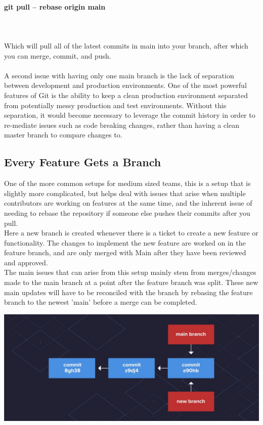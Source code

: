 \documentclass{article}
\begin{document}
\paragraph{git pull -- rebase origin main} \mbox{}\\ \\
Which will pull all of the latest commits in main into your branch, after which you can merge, commit, and push. 
\\ \\
A second issue with having only one main branch is the lack of separation between development and production environments. One of the most powerful features of Git is the ability to keep a clean production environment separated from potentially messy production and test environments. Without this separation, it would become necessary to leverage the commit history in order to re-mediate issues such as code breaking changes, rather than having a clean master branch to compare changes to.
\subsection{Every Feature Gets a Branch}
One of the more common setups for medium sized teams, this is a setup that is slightly more complicated, but helps deal with issues that arise when multiple contributors are working on features at the same time, and the inherent issue of needing to rebase the repository if someone else pushes their commits after you pull. \\
Here a new branch is created whenever there is a ticket to create a new feature or functionality. The changes to implement the new feature are worked on in the feature branch, and are only merged with Main after they have been reviewed and approved. \\
The main issues that can arise from this setup mainly stem from merges/changes made to the main branch at a point after the feature branch was split. These new main updates will have to be reconciled with the branch by rebasing the feature branch to the newest 'main' before a merge can be completed.

\begin{center}
\includegraphics[width=\textwidth]{merge_picture.jpg}
\end{center}
\end{document}
